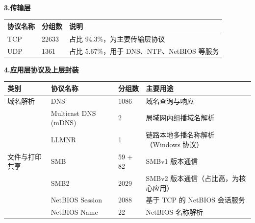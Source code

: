 \documentclass[12pt]{ctexart}
\begin{document}
		\vspace*{1\baselineskip}
		\noindent
		\textbf{3.传输层}\\
		\begin{minipage}{\linewidth}
			\centering
			\begin{tabular}{lll}
				\toprule
				协议名称&	分组数&	说明\\
				\midrule
				TCP	&22633&	占比 94.3\%，为主要传输层协议\\
				UDP	&1361&	占比 5.67\%，用于 DNS、NTP、NetBIOS 等服务\\
				\bottomrule
			\end{tabular}
		\end{minipage}
		
		\vspace*{\baselineskip}
		\noindent
		\textbf{4.应用层协议及上层封装}\\
		\begin{minipage}{\linewidth}
			\centering
			\begin{tabular}{llll}
				\toprule
				类别	&协议名称&	分组数&	主要用途\\
				\midrule
				域名解析	&DNS	&1086	&域名查询与响应\\
				&Multicast DNS (mDNS)&	2	&局域网内组播域名解析\\
				&LLMNR	&1	&链路本地多播名称解析（Windows 协议）\\
				文件与打印共享	&SMB&	59 + 82&	SMBv1 版本通信\\
				&SMB2&	2029	&SMBv2 版本通信（占比高，为核心应用）\\
				&NetBIOS Session&	2088&	基于 TCP 的 NetBIOS 会话服务\\
				&NetBIOS Name&	22&	NetBIOS 名称解析\\
			\end{tabular}
		\end{minipage}
\end{document}

